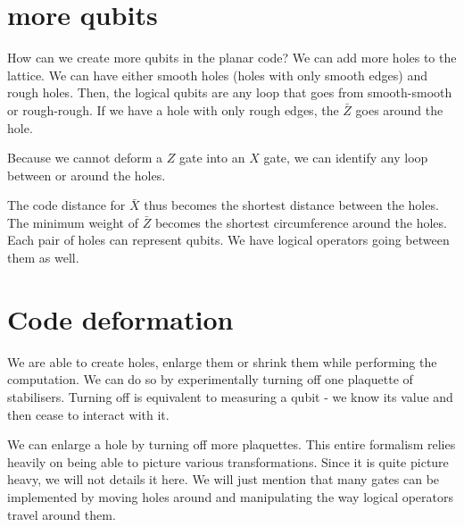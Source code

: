 \section{more qubits}
How can we create more qubits in the planar code? We can add more holes to the lattice. We can have either smooth holes (holes with only smooth edges) and rough holes. Then, the logical qubits are any loop that goes from smooth-smooth or rough-rough. If we have a hole with only rough edges, the $\bar{Z}$ goes around the hole. 

Because we cannot deform a $Z$ gate into an $X$ gate, we can identify any loop between or around the holes. 

The code distance for $\bar{X}$ thus becomes the shortest distance between the holes. The minimum weight of $\bar{Z}$ becomes the shortest circumference around the holes. Each pair of holes can represent qubits. We have logical operators going between them as well. 

\section{Code deformation}
We are able to create holes, enlarge them or shrink them while performing the computation. We can do so by experimentally turning off one plaquette of stabilisers. Turning off is equivalent to measuring a qubit - we know its value and then cease to interact with it. 

We can enlarge a hole by turning off more plaquettes. This entire formalism relies heavily on being able to picture various transformations. Since it is quite picture heavy, we will not details it here. We will just mention that many gates can be implemented by moving holes around and manipulating the way logical operators travel around them. 



